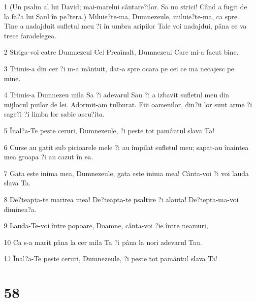 \par 1 (Un psalm al lui David; mai-marelui cântare?ilor. Sa nu strici! Când a fugit de la fa?a lui Saul în pe?tera.) Miluie?te-ma, Dumnezeule, miluie?te-ma, ca spre Tine a nadajduit sufletul meu ?i în umbra aripilor Tale voi nadajdui, pâna ce va trece faradelegea.
\par 2 Striga-voi catre Dumnezeul Cel Preaînalt, Dumnezeul Care mi-a facut bine.
\par 3 Trimis-a din cer ?i m-a mântuit, dat-a spre ocara pe cei ce ma necajesc pe mine.
\par 4 Trimis-a Dumnezeu mila Sa ?i adevarul Sau ?i a izbavit sufletul meu din mijlocul puilor de lei. Adormit-am tulburat. Fiii oamenilor, din?ii lor sunt arme ?i sage?i ?i limba lor sabie ascu?ita.
\par 5 Înal?a-Te peste ceruri, Dumnezeule, ?i peste tot pamântul slava Ta!
\par 6 Curse au gatit sub picioarele mele ?i au împilat sufletul meu; sapat-au înaintea mea groapa ?i au cazut în ea.
\par 7 Gata este inima mea, Dumnezeule, gata este inima mea! Cânta-voi ?i voi lauda slava Ta.
\par 8 De?teapta-te marirea mea! De?teapta-te psaltire ?i alauta! De?tepta-ma-voi diminea?a.
\par 9 Lauda-Te-voi între popoare, Doamne, cânta-voi ?ie între neamuri,
\par 10 Ca s-a marit pâna la cer mila Ta ?i pâna la nori adevarul Tau.
\par 11 Înal?a-Te peste ceruri, Dumnezeule, ?i peste tot pamântul slava Ta!

\chapter{58}

